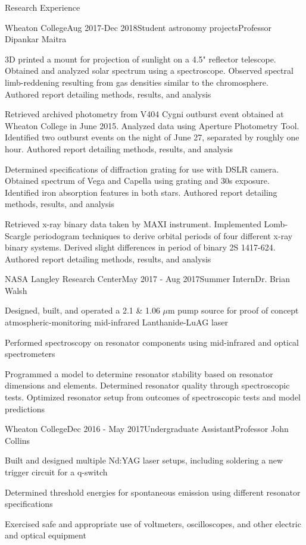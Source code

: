 \documentclass{resume} %
\begin{document}
\begin{rSection}{Research Experience}
\begin{rSubsection}{Wheaton College}{Aug 2017-Dec 2018}{Student astronomy projects}{Professor Dipankar Maitra}
\item 3D printed a mount for projection of sunlight on a 4.5" reflector telescope. Obtained and analyzed solar spectrum using a spectroscope. Observed spectral limb-reddening resulting from gas densities similar to the chromosphere. Authored report detailing methods, results, and analysis
\item Retrieved archived photometry from V404 Cygni outburst event obtained at Wheaton College in June 2015. Analyzed data using Aperture Photometry Tool. Identified two outburst events on the night of June 27, separated by roughly one hour. Authored report detailing methods, results, and analysis
\item Determined specifications of diffraction grating for use with DSLR camera. Obtained spectrum of Vega and Capella using grating and 30s exposure. Identified iron absorption features in both stars. Authored report detailing methods, results, and analysis
\item Retrieved x-ray binary data taken by MAXI instrument. Implemented Lomb-Scargle periodogram techniques to derive orbital periods of four different x-ray binary systems. Derived slight differences in period of binary 2S 1417-624. Authored report detailing methods, results, and analysis
\end{rSubsection}

\begin{rSubsection}{NASA Langley Research Center}{May 2017 - Aug 2017}{Summer Intern}{Dr. Brian Walsh}
\item Designed, built, and operated a 2.1 \& 1.06 $\mu$m pump source for proof of concept atmospheric-monitoring mid-infrared Lanthanide-LuAG laser
\item Performed spectroscopy on resonator components using mid-infrared and optical spectrometers
\item Programmed a model to determine resonator stability based on resonator dimensions and elements. Determined resonator quality through spectroscopic tests. Optimized resonator setup from outcomes of spectroscopic tests and model predictions
\end{rSubsection}

\begin{rSubsection}{Wheaton College}{Dec 2016 - May 2017}{Undergraduate Assistant}{Professor John Collins}
\item Built and designed multiple Nd:YAG laser setups, including soldering a new trigger circuit for a q-switch
\item Determined threshold energies for spontaneous emission using different resonator specifications
\item Exercised safe and appropriate use of voltmeters, oscilloscopes, and other electric and optical equipment
\end{rSubsection}

\end{rSection}
\end{document}
